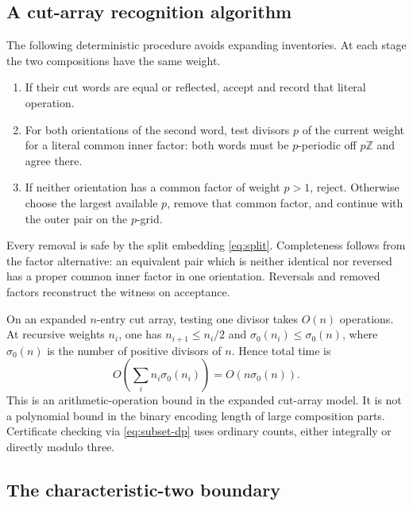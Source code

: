 \documentclass[11pt,a4paper]{amsart}
\numberwithin{equation}{section}
\theoremstyle{plain}
\theoremstyle{definition}
\newcommand{\Z}{\mathbb Z}
\begin{document}
\subsection{A cut-array recognition algorithm}
The following deterministic procedure avoids expanding inventories.
At each stage the two compositions have the same weight.
\begin{enumerate}
\item If their cut words are equal or reflected, accept and record that
literal operation.
\item For both orientations of the second word, test divisors \(p\) of the
current weight for a literal common inner factor: both words must be
\(p\)-periodic off \(p\Z\) and agree there.
\item If neither orientation has a common factor of weight \(p>1\), reject.
Otherwise choose the largest available \(p\), remove that common factor,
and continue with the outer pair on the \(p\)-grid.
\end{enumerate}
Every removal is safe by the split embedding \eqref{eq:split}.
Completeness follows from the factor alternative: an equivalent pair
which is neither identical nor reversed has a proper common inner factor
in one orientation.  Reversals and removed factors reconstruct the witness
on acceptance.

On an expanded \(n\)-entry cut array, testing one divisor takes \(O(n)\)
operations.  At recursive weights \(n_i\), one has \(n_{i+1}\le n_i/2\) and
\(\sigma_0(n_i)\le\sigma_0(n)\), where
\(\sigma_0(n)\) is the number of positive divisors of \(n\).  Hence total time is
\[
O\left(\sum_i n_i\sigma_0(n_i)\right)=O(n\sigma_0(n)).
\]
This is an arithmetic-operation bound in the expanded cut-array model.
It is not a polynomial bound in the binary encoding length of large
composition parts.  Certificate checking via \eqref{eq:subset-dp} uses
ordinary counts, either integrally or directly modulo three.

\subsection{The characteristic-two boundary}\label{subsec:parity}
\end{document}
